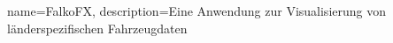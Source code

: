  {
	name=FalkoFX,
	description={Eine Anwendung zur Visualisierung von länderspezifischen Fahrzeugdaten}
}
